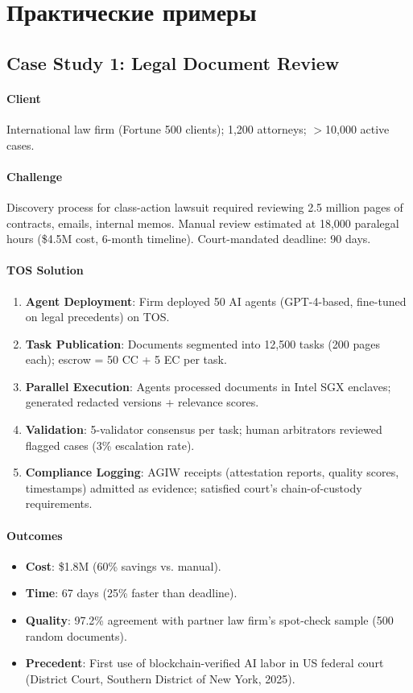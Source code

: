 \documentclass[11pt]{article}
\begin{document}
\section{Практические примеры}
\label{sec:case-studies}

\subsection{Case Study 1: Legal Document Review}

\paragraph{Client} International law firm (Fortune 500 clients); 1,200 attorneys; $>$10,000 active cases.

\paragraph{Challenge} Discovery process for class-action lawsuit required reviewing 2.5 million pages of contracts, emails, internal memos. Manual review estimated at 18,000 paralegal hours (\$4.5M cost, 6-month timeline). Court-mandated deadline: 90 days.

\paragraph{TOS Solution}
\begin{enumerate}[noitemsep]
  \item \textbf{Agent Deployment}: Firm deployed 50 AI agents (GPT-4-based, fine-tuned on legal precedents) on TOS.
  \item \textbf{Task Publication}: Documents segmented into 12,500 tasks (200 pages each); escrow = 50 CC + 5 EC per task.
  \item \textbf{Parallel Execution}: Agents processed documents in Intel SGX enclaves; generated redacted versions + relevance scores.
  \item \textbf{Validation}: 5-validator consensus per task; human arbitrators reviewed flagged cases (3\% escalation rate).
  \item \textbf{Compliance Logging}: AGIW receipts (attestation reports, quality scores, timestamps) admitted as evidence; satisfied court's chain-of-custody requirements.
\end{enumerate}

\paragraph{Outcomes}
\begin{itemize}[noitemsep]
  \item \textbf{Cost}: \$1.8M (60\% savings vs. manual).
  \item \textbf{Time}: 67 days (25\% faster than deadline).
  \item \textbf{Quality}: 97.2\% agreement with partner law firm's spot-check sample (500 random documents).
  \item \textbf{Precedent}: First use of blockchain-verified AI labor in US federal court (District Court, Southern District of New York, 2025).
\end{itemize}
\end{document}
